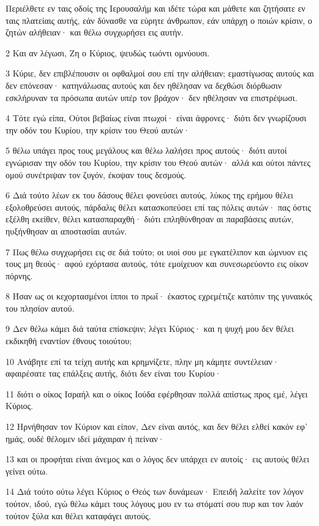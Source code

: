 \par Περιέλθετε εν ταις οδοίς της Ιερουσαλήμ και ιδέτε τώρα και μάθετε και ζητήσατε εν ταις πλατείαις αυτής, εάν δύνασθε να εύρητε άνθρωπον, εάν υπάρχη ο ποιών κρίσιν, ο ζητών αλήθειαν· και θέλω συγχωρήσει εις αυτήν.
\par 2 Και αν λέγωσι, Ζη ο Κύριος, ψευδώς τωόντι ομνύουσι.
\par 3 Κύριε, δεν επιβλέπουσιν οι οφθαλμοί σου επί την αλήθειαν; εμαστίγωσας αυτούς και δεν επόνεσαν· κατηνάλωσας αυτούς και δεν ηθέλησαν να δεχθώσι διόρθωσιν εσκλήρυναν τα πρόσωπα αυτών υπέρ τον βράχον· δεν ηθέλησαν να επιστρέψωσι.
\par 4 Τότε εγώ είπα, Ούτοι βεβαίως είναι πτωχοί· είναι άφρονες· διότι δεν γνωρίζουσι την οδόν του Κυρίου, την κρίσιν του Θεού αυτών·
\par 5 θέλω υπάγει προς τους μεγάλους και θέλω λαλήσει προς αυτούς· διότι αυτοί εγνώρισαν την οδόν του Κυρίου, την κρίσιν του Θεού αυτών· αλλά και ούτοι πάντες ομού συνέτριψαν τον ζυγόν, έκοψαν τους δεσμούς.
\par 6 Διά τούτο λέων εκ του δάσους θέλει φονεύσει αυτούς, λύκος της ερήμου θέλει εξολοθρεύσει αυτούς, πάρδαλις θέλει κατασκοπεύσει επί τας πόλεις αυτών· πας όστις εξέλθη εκείθεν, θέλει κατασπαραχθή· διότι επληθύνθησαν αι παραβάσεις αυτών, ηυξήνθησαν αι αποστασίαι αυτών.
\par 7 Πως θέλω συγχωρήσει εις σε διά τούτο; οι υιοί σου με εγκατέλιπον και ώμνυον εις τους μη θεούς· αφού εχόρτασα αυτούς, τότε εμοίχευον και συνεσωρεύοντο εις οίκον πόρνης.
\par 8 Ήσαν ως οι κεχορτασμένοι ίπποι το πρωΐ· έκαστος εχρεμέτιζε κατόπιν της γυναικός του πλησίον αυτού.
\par 9 Δεν θέλω κάμει διά ταύτα επίσκεψιν; λέγει Κύριος· και η ψυχή μου δεν θέλει εκδικηθή εναντίον έθνους τοιούτου;
\par 10 Ανάβητε επί τα τείχη αυτής και κρημνίζετε, πλην μη κάμητε συντέλειαν· αφαιρέσατε τας επάλξεις αυτής, διότι δεν είναι του Κυρίου·
\par 11 διότι ο οίκος Ισραήλ και ο οίκος Ιούδα εφέρθησαν πολλά απίστως προς εμέ, λέγει Κύριος.
\par 12 Ηρνήθησαν τον Κύριον και είπον, Δεν είναι αυτός, και δεν θέλει ελθεί κακόν εφ' ημάς, ουδέ θέλομεν ιδεί μάχαιραν ή πείναν·
\par 13 και οι προφήται είναι άνεμος και ο λόγος δεν υπάρχει εν αυτοίς· εις αυτούς θέλει γείνει ούτω.
\par 14 Διά τούτο ούτω λέγει Κύριος ο Θεός των δυνάμεων· Επειδή λαλείτε τον λόγον τούτον, ιδού, εγώ θέλω κάμει τους λόγους μου εν τω στόματί σου πυρ και τον λαόν τούτον ξύλα και θέλει καταφάγει αυτούς.

